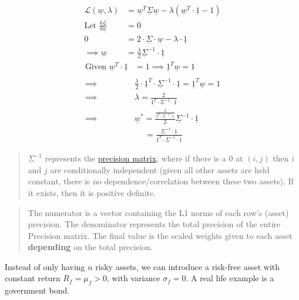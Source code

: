\documentclass[
  oneside]{book}
\begin{document}
\[
\begin{aligned}
\mathcal{L}(\underline{w},\lambda) &= \underline{w}^{T}\underline{\Sigma}\underline{w} - \lambda(\underline{w}^{T}\cdot \underline{1}-1)\\
\text{Let }\frac{\delta\mathcal{L}}{\delta \underline{w}}&= 0\\
0 &= 2\cdot\underline{\Sigma}\cdot \underline{w}-\lambda\cdot  \underline{1} \\
\implies \underline{w} &= \frac{\lambda}{2}\underline{\Sigma}^{-1}\cdot \underline{1}
\end{aligned}
\]
\[
\begin{aligned}
\text{Given } \underline{w}^{T}\cdot  \underline{1} &= 1 \implies  \underline{1}^{T}\underline{w} = 1\\ \\
\implies& \frac{\lambda}{2}\cdot   \underline{1}^{T}\cdot\underline{\Sigma}^{-1}\cdot  \underline{1} = \underline{1}^{T}\underline{w}  = 1\\
\implies& \lambda = \frac{2}{\underline{1}^{T}\cdot\underline{\Sigma}^{-1}\cdot  \underline{1}}\\
\implies &\underline{w}^{*} = \frac{\frac{2}{\underline{1}^{T}\cdot\underline{\Sigma}^{-1}\cdot  \underline{1}}}{2}\underline{\Sigma}^{-1}\cdot \underline{1}\\
& \quad \ = \frac{\underline{\Sigma}^{-1}\cdot \underline{1}}{\underline{1}^{T}\cdot\underline{\Sigma}^{-1}\cdot  \underline{1}}
\end{aligned}
\]

\begin{quote}
\(\underline{\Sigma}^{-1}\) represents the \href{https://stephens999.github.io/fiveMinuteStats/normal_markov_chain.html}{precision matrix}, where if there is a 0 at \((i,j)\) then \(i\) and \(j\) are conditionally independent (given all other assets are held constant, there is no dependence/correlation between these two assets). If it exists, then it is positive definite.
\end{quote}

\begin{quote}
The numerator is a vector containing the L1 norms of each row's (asset) precision.
The denominator represents the total precision of the entire Precision matrix.
The final value is the scaled weights given to each asset \textbf{depending} on the total precision.
\end{quote}

Instead of only having \(n\) risky assets, we can introduce a risk-free asset with constant return \(R_{f}=\mu_{f}>0\), with variance \(\sigma_{f} =0\). A real life example is a government bond.
\end{document}
